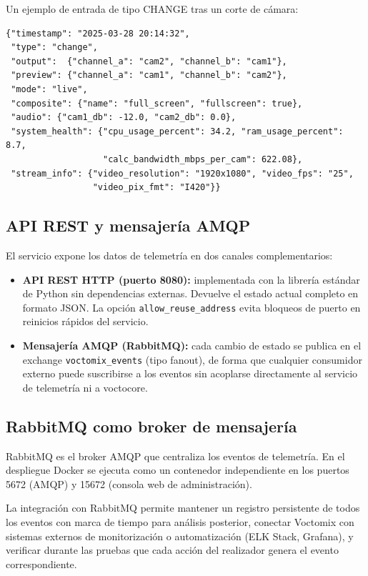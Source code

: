 Un ejemplo de entrada de tipo CHANGE tras un corte de cámara:

\begin{verbatim}
{"timestamp": "2025-03-28 20:14:32",
 "type": "change",
 "output":  {"channel_a": "cam2", "channel_b": "cam1"},
 "preview": {"channel_a": "cam1", "channel_b": "cam2"},
 "mode": "live",
 "composite": {"name": "full_screen", "fullscreen": true},
 "audio": {"cam1_db": -12.0, "cam2_db": 0.0},
 "system_health": {"cpu_usage_percent": 34.2, "ram_usage_percent": 8.7,
                   "calc_bandwidth_mbps_per_cam": 622.08},
 "stream_info": {"video_resolution": "1920x1080", "video_fps": "25",
                 "video_pix_fmt": "I420"}}
\end{verbatim}

\subsection{API REST y mensajería AMQP}

El servicio expone los datos de telemetría en dos canales complementarios:

\begin{itemize}
  \item \textbf{API REST HTTP (puerto 8080):} implementada con la librería estándar de
        Python sin dependencias externas. Devuelve el estado actual completo en formato
        JSON. La opción \texttt{allow\_reuse\_address} evita bloqueos de puerto en
        reinicios rápidos del servicio.
  \item \textbf{Mensajería AMQP (RabbitMQ):} cada cambio de estado se publica en el
        exchange \texttt{voctomix\_events} (tipo fanout), de forma que cualquier
        consumidor externo puede suscribirse a los eventos sin acoplarse directamente
        al servicio de telemetría ni a voctocore.
\end{itemize}

\subsection{RabbitMQ como broker de mensajería}
\label{sec:rabbitmq}

RabbitMQ es el broker AMQP que centraliza los eventos de telemetría. En el despliegue
Docker se ejecuta como un contenedor independiente en los puertos 5672 (AMQP) y 15672
(consola web de administración).

La integración con RabbitMQ permite mantener un registro persistente de todos los
eventos con marca de tiempo para análisis posterior, conectar Voctomix con sistemas
externos de monitorización o automatización (ELK Stack, Grafana), y verificar durante
las pruebas que cada acción del realizador genera el evento correspondiente.

